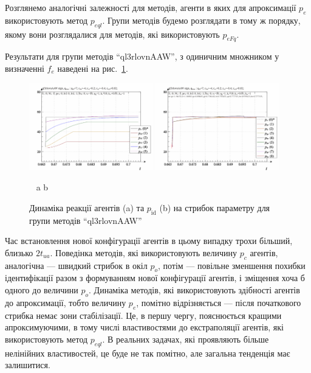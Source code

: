 
Розглянемо аналогічні залежності для методів, агенти в яких
для апроксимації
$p_e$ використовують метод
$p_{eql}$. Групи методів будемо розглядати в тому ж порядку, якому
вони розглядалися для методів, які використовують
$p_{eFq}$.

Результати для групи методів ``ql3rlovnAAW'', з одиничним множником
у визначенні
$f_e$ наведені на рис.~\ref{atu:f:ql3rlovnAAW_sign}.

\begin{figure}[htb!]
  \begin{center}
    \includegraphics[width=0.48\textwidth]{p/sign/qls-p_t_pi_m_ql3rlovnAAW_sign.png}
    \hfill
    \includegraphics[width=0.48\textwidth]{p/sign/qls-p_t_p_m_ql3rlovnAAW_sign.png}
  \end{center}
  \vspace{-1.0ex}
  \begin{center}
    ~ \hfill a \hfill\hfill b  \hfill ~
  \end{center}
  \vspace{-1.5ex}
  \caption{Динаміка реакції агентів (a) та $p_\mathrm{id}$ (b) на стрибок параметру для групи методів ``ql3rlovnAAW''}
  \label{atu:f:ql3rlovnAAW_sign}
\end{figure}

Час встановлення нової конфігурації агентів в цьому випадку
трохи більший, близько
$2 t_{ua}$. Поведінка методів, які використовують величину
$p_c$ агентів, аналогічна --- швидкий стрибок в окіл
$p_o$, потім --- повільне зменшення похибки ідентифікації разом
з формуванням нової конфігурації агентів, і зміщення хоча б
одного до величини
$p_o$. Динаміка методів, які використовують
здібності агентів до апроксимації, тобто величину
$p_e$, помітно відрізняється --- після початкового стрибка немає
зони стабілізації. Це, в першу чергу, пояснюється кращими
апроксимуючими, в тому числі властивостями до екстраполяції
агентів, які використовують метод
$p_{eql}$. В реальних задачах, які проявляють більше нелінійних
властивостей, це буде не так помітно, але загальна тенденція має
залишитися.

